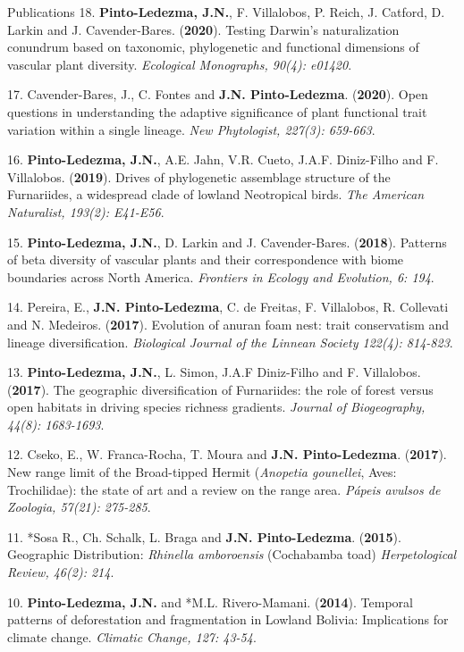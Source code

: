 \documentclass{resume} %
\begin{document}
\begin{rSection}{Publications}
{18.} {\bf{Pinto-Ledezma, J.N.}}, {F. Villalobos, P. Reich, J. Catford, D. Larkin and J. Cavender-Bares. ({{\bf 2020}}). Testing Darwin's naturalization conundrum based on taxonomic, phylogenetic and functional dimensions of vascular plant diversity.} {\em Ecological Monographs, 90(4): e01420}.

{17.} {Cavender-Bares, J., C. Fontes and} {\bf{J.N. Pinto-Ledezma}}. {({{\bf 2020}}). Open questions in understanding the adaptive significance of plant functional trait variation within a single lineage.} {\em New Phytologist, 227(3): 659-663}.

{16.} {\bf{Pinto-Ledezma, J.N.}}, {A.E. Jahn, V.R. Cueto, J.A.F. Diniz-Filho and F. Villalobos. ({{\bf 2019}}). Drives of phylogenetic assemblage structure of the Furnariides, a widespread clade of lowland Neotropical birds.} {\em The American Naturalist, 193(2): E41-E56}. 

{15.} {\bf{Pinto-Ledezma, J.N.}}, {D. Larkin and J. Cavender-Bares. ({{\bf 2018}}). Patterns of beta diversity of vascular plants and their correspondence with biome boundaries across North America.} {\em Frontiers in Ecology and Evolution, 6: 194}.

{14.} {Pereira, E.,} {\bf{J.N. Pinto-Ledezma}}, {C. de Freitas, F. Villalobos, R. Collevati and N. Medeiros. ({{\bf 2017}}). Evolution of anuran foam nest: trait conservatism and lineage diversification.} {\em Biological Journal of the Linnean Society 122(4): 814-823}. 

{13.} {\bf{Pinto-Ledezma, J.N.}}, {L. Simon, J.A.F Diniz-Filho and F. Villalobos. ({{\bf 2017}}). The geographic diversification of Furnariides: the role of forest versus open habitats in driving species richness gradients.} {\em Journal of Biogeography, 44(8): 1683-1693}. 

{12.} {Cseko, E., W. Franca-Rocha, T. Moura and} {\bf{J.N. Pinto-Ledezma}}. {({{\bf 2017}}). New range limit of the Broad-tipped Hermit ({\em Anopetia gounellei}, Aves: Trochilidae): the state of art and a review on the range area.} {\em Pápeis avulsos de Zoologia, 57(21): 275-285}. 

{11.} {*Sosa R., Ch. Schalk, L. Braga and} {\bf{J.N. Pinto-Ledezma}}. {({{\bf 2015}}). Geographic Distribution: {\em Rhinella amboroensis} (Cochabamba toad)} {\em Herpetological Review, 46(2): 214}.

{10.} {\bf{Pinto-Ledezma, J.N.}} {and *M.L. Rivero-Mamani. ({{\bf 2014}}). Temporal patterns of deforestation and fragmentation in Lowland Bolivia: Implications for climate change.} {\em Climatic Change, 127: 43-54}. 


\end{rSection}
\end{document}

